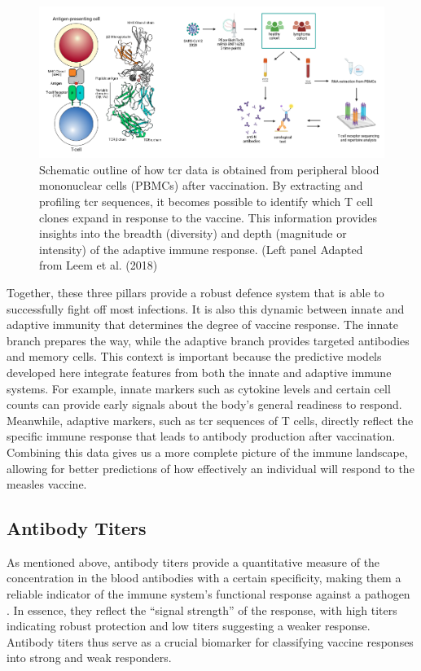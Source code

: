 \documentclass[12pt,a4paper]{report}
\begin{document}
\begin{figure}[h]
  \centering
  \includegraphics[width=1\textwidth]{images/TCR_profiling.png}
  \caption[ \gls{tcr} sequencing Workflow]{Schematic outline of how \gls{tcr} data is obtained from peripheral blood mononuclear cells (PBMCs) after vaccination. By extracting and profiling \gls{tcr} sequences, it becomes possible to identify which T cell clones expand in response to the vaccine. This information provides insights into the breadth (diversity) and depth (magnitude or intensity) of the adaptive immune response. (Left panel Adapted from Leem et al. (2018) \cite{Leem2018IMGTHLA}}
  \label{fig:TCR_profiling}
\end{figure}

\noindent
Together, these three pillars provide a robust defence system that is able to successfully fight off most infections. It is also this dynamic between innate and adaptive immunity that determines the degree of vaccine response. The innate branch prepares the way, while the adaptive branch provides targeted antibodies and memory cells. This context is important because the predictive models developed here integrate features from both the innate and adaptive immune systems. For example, innate markers such as cytokine levels and certain cell counts can provide early signals about the body's general readiness to respond. Meanwhile, adaptive markers, such as \gls{tcr} sequences of T cells, directly reflect the specific immune response that leads to antibody production after vaccination. Combining this data gives us a more complete picture of the immune landscape, allowing for better predictions of how effectively an individual will respond to the measles vaccine.

\subsection{Antibody Titers}
\label{sec:antibody_titers}
As mentioned above, antibody titers provide a quantitative measure of the concentration in the blood antibodies with a certain specificity, making them a reliable indicator of the immune system’s functional response against a pathogen \cite{plotkin2010correlates}. In essence, they reflect the “signal strength” of the response, with high titers indicating robust protection and low titers suggesting a weaker response. Antibody titers thus serve as a crucial biomarker for classifying vaccine responses into strong and weak responders. 
\end{document}
